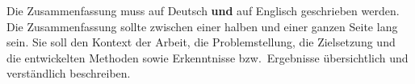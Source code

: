 

Die Zusammenfassung muss auf Deutsch \textbf{und} auf Englisch geschrieben
werden. Die Zusammenfassung sollte zwischen einer halben und einer
ganzen Seite lang sein. Sie soll den Kontext der Arbeit, die
Problemstellung, die Zielsetzung und die entwickelten Methoden sowie
Erkenntnisse bzw.~Ergebnisse übersichtlich und verständlich
beschreiben.